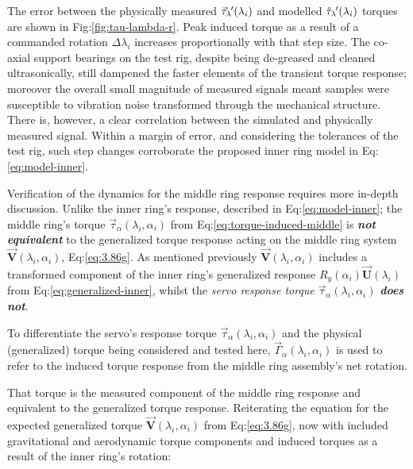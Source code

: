 \par
The error between the physically measured $\vec{\tau}_\lambda\hspace{-1pt}'(\lambda_i)$ and modelled $\hat{\tau}_\lambda\hspace{-1pt}'(\lambda_i)$ torques are shown in Fig:\ref{fig:tau-lambda-r}. Peak induced torque as a result of a commanded rotation $\Delta\lambda_i$ increases proportionally with that step size. The co-axial support bearings on the test rig, despite being de-greased and cleaned ultrasonically, still dampened the faster elements of the transient torque response; moreover the overall small magnitude of measured signals meant samples were susceptible to vibration noise transformed through the mechanical structure. There is, however, a clear correlation between the simulated and physically measured signal. Within a margin of error, and considering the tolerances of the test rig, such step changes corroborate the proposed inner ring model in Eq:\ref{eq:model-inner}.
\par
Verification of the dynamics for the middle ring response requires more in-depth discussion. Unlike the inner ring's response, described in Eq:\ref{eq:model-inner}; the middle ring's torque $\vec{\tau}_\alpha(\lambda_i,\alpha_i)$ from Eq:\ref{eq:torque-induced-middle} is \emph{\textbf{not equivalent}} to the generalized torque response acting on the middle ring system $\vec{\mathbf{V}}(\lambda_i,\alpha_i)$, Eq:\ref{eq:3.86g}. As mentioned previously $\vec{\mathbf{V}}(\lambda_i,\alpha_i)$ includes a transformed component of the inner ring's generalized response $R_y(\alpha_i)\vec{\mathbf{U}}(\lambda_i)$ from Eq:\ref{eq:generalized-inner}, whilst the \emph{servo response torque} $\vec{\tau}_\alpha(\lambda_i,\alpha_i)$ \emph{\textbf{does not}}. 
\par
To differentiate the servo's response torque $\vec{\tau}_\alpha(\lambda_i,\alpha_i)$ and the physical (generalized) torque being considered and tested here, $\vec{\Gamma}_\alpha(\lambda_i,\alpha_i)$ is used to refer to the induced torque response from the middle ring assembly's net rotation. 
\par
That torque is the measured component of the middle ring response and equivalent to the generalized torque response. Reiterating the equation for the expected generalized torque $\vec{\mathbf{V}}(\lambda_i,\alpha_i)$ from Eq:\ref{eq:3.86g}, now with included gravitational and aerodynamic torque components and induced torques as a result of the inner ring's rotation:
